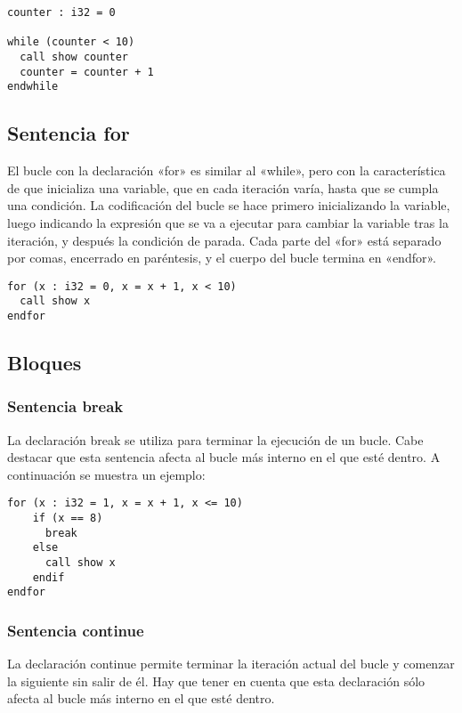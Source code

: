 \begin{verbatim}
counter : i32 = 0

while (counter < 10)
  call show counter
  counter = counter + 1
endwhile
\end{verbatim}

\subsection{Sentencia for}
El bucle con la declaración «for» es similar al «while», pero con la característica de que
inicializa una variable, que en cada iteración varía, hasta que se cumpla una condición.
La codificación del bucle se hace primero inicializando la variable, luego indicando la
expresión que se va a ejecutar para cambiar la variable tras la iteración, y después la
condición de parada. Cada parte del «for» está separado por comas, encerrado en paréntesis,
y el cuerpo del bucle termina en «endfor».

\begin{verbatim}
for (x : i32 = 0, x = x + 1, x < 10)
  call show x
endfor
\end{verbatim}

\subsection{Bloques}
\subsubsection{Sentencia break}

La declaración break se utiliza para terminar la ejecución de un bucle.
Cabe destacar que esta sentencia afecta al bucle más interno en el que esté dentro.
A continuación se muestra un ejemplo:

\begin{verbatim}
for (x : i32 = 1, x = x + 1, x <= 10)
    if (x == 8)
      break
    else
      call show x
    endif
endfor
\end{verbatim}

\subsubsection{Sentencia continue}

La declaración continue permite terminar la iteración actual del bucle y
comenzar la siguiente sin salir de él. Hay que tener en cuenta que esta
declaración sólo afecta al bucle más interno en el que esté dentro.

